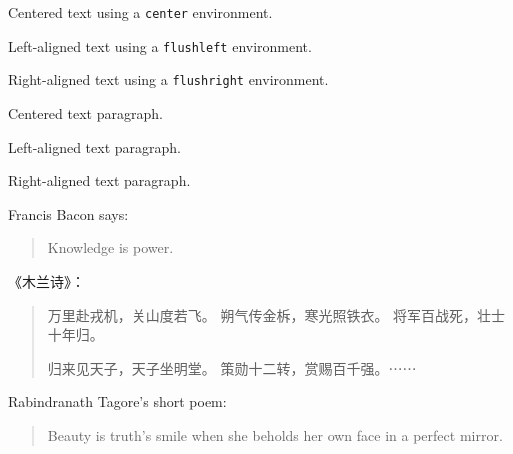 \documentclass{book}
\begin{document}
        
		\begin{center}
            Centered text using a
            \verb|center| environment.
		\end{center}
		\begin{flushleft}
            Left-aligned text using a
            \verb|flushleft| environment.
		\end{flushleft}
		\begin{flushright}
            Right-aligned text using a
            \verb|flushright| environment.
		\end{flushright}
		{\centering Centered text paragraph.
		
		}
		{\raggedright Left-aligned text paragraph.
		
		}
		{\raggedleft Right-aligned text paragraph.
		
		}
		
		
		Francis Bacon says:
		\begin{quote}
            Knowledge is power.
		\end{quote}
            《木兰诗》：
		\begin{quotation}
            万里赴戎机，关山度若飞。
            朔气传金柝，寒光照铁衣。
            将军百战死，壮士十年归。
            
            
            归来见天子，天子坐明堂。
            策勋十二转，赏赐百千强。⋯⋯
		\end{quotation}
        Rabindranath Tagore’s short poem:
		\begin{verse}
            Beauty is truth’s smile
            when she beholds her own face in
            a perfect mirror.
		\end{verse}
		
\end{document}
